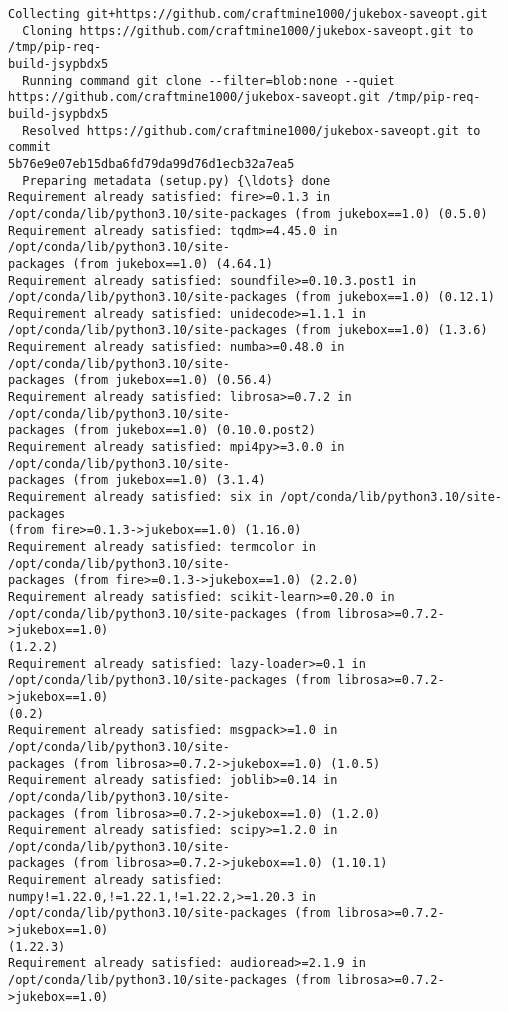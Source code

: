 \documentclass[11pt]{article}
\begin{document}
    \begin{Verbatim}[commandchars=\\\{\}]
Collecting git+https://github.com/craftmine1000/jukebox-saveopt.git
  Cloning https://github.com/craftmine1000/jukebox-saveopt.git to /tmp/pip-req-
build-jsypbdx5
  Running command git clone --filter=blob:none --quiet
https://github.com/craftmine1000/jukebox-saveopt.git /tmp/pip-req-build-jsypbdx5
  Resolved https://github.com/craftmine1000/jukebox-saveopt.git to commit
5b76e9e07eb15dba6fd79da99d76d1ecb32a7ea5
  Preparing metadata (setup.py) {\ldots} done
Requirement already satisfied: fire>=0.1.3 in
/opt/conda/lib/python3.10/site-packages (from jukebox==1.0) (0.5.0)
Requirement already satisfied: tqdm>=4.45.0 in /opt/conda/lib/python3.10/site-
packages (from jukebox==1.0) (4.64.1)
Requirement already satisfied: soundfile>=0.10.3.post1 in
/opt/conda/lib/python3.10/site-packages (from jukebox==1.0) (0.12.1)
Requirement already satisfied: unidecode>=1.1.1 in
/opt/conda/lib/python3.10/site-packages (from jukebox==1.0) (1.3.6)
Requirement already satisfied: numba>=0.48.0 in /opt/conda/lib/python3.10/site-
packages (from jukebox==1.0) (0.56.4)
Requirement already satisfied: librosa>=0.7.2 in /opt/conda/lib/python3.10/site-
packages (from jukebox==1.0) (0.10.0.post2)
Requirement already satisfied: mpi4py>=3.0.0 in /opt/conda/lib/python3.10/site-
packages (from jukebox==1.0) (3.1.4)
Requirement already satisfied: six in /opt/conda/lib/python3.10/site-packages
(from fire>=0.1.3->jukebox==1.0) (1.16.0)
Requirement already satisfied: termcolor in /opt/conda/lib/python3.10/site-
packages (from fire>=0.1.3->jukebox==1.0) (2.2.0)
Requirement already satisfied: scikit-learn>=0.20.0 in
/opt/conda/lib/python3.10/site-packages (from librosa>=0.7.2->jukebox==1.0)
(1.2.2)
Requirement already satisfied: lazy-loader>=0.1 in
/opt/conda/lib/python3.10/site-packages (from librosa>=0.7.2->jukebox==1.0)
(0.2)
Requirement already satisfied: msgpack>=1.0 in /opt/conda/lib/python3.10/site-
packages (from librosa>=0.7.2->jukebox==1.0) (1.0.5)
Requirement already satisfied: joblib>=0.14 in /opt/conda/lib/python3.10/site-
packages (from librosa>=0.7.2->jukebox==1.0) (1.2.0)
Requirement already satisfied: scipy>=1.2.0 in /opt/conda/lib/python3.10/site-
packages (from librosa>=0.7.2->jukebox==1.0) (1.10.1)
Requirement already satisfied: numpy!=1.22.0,!=1.22.1,!=1.22.2,>=1.20.3 in
/opt/conda/lib/python3.10/site-packages (from librosa>=0.7.2->jukebox==1.0)
(1.22.3)
Requirement already satisfied: audioread>=2.1.9 in
/opt/conda/lib/python3.10/site-packages (from librosa>=0.7.2->jukebox==1.0)

\end{Verbatim}
\end{document}
